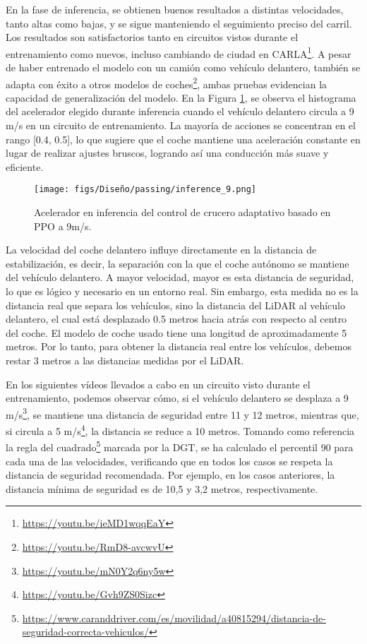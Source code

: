 En la fase de inferencia, se obtienen buenos resultados a distintas velocidades, tanto altas como bajas, y se sigue manteniendo el seguimiento preciso del carril. Los resultados son satisfactorios tanto en circuitos vistos durante el entrenamiento como nuevos, incluso cambiando de ciudad en CARLA\footnote{\url{https://youtu.be/ieMD1wqqEaY}}. A pesar de haber entrenado el modelo con un camión como vehículo delantero, también se adapta con éxito a otros modelos de coches\footnote{\url{https://youtu.be/RmD8-avcwvU}}, ambas pruebas evidencian la capacidad de generalización del modelo. En la Figura \ref{fig:infrence_passing}, se observa el histograma del acelerador elegido durante inferencia cuando el vehículo delantero circula a 9 m/s en un circuito de entrenamiento. La mayoría de acciones se concentran en el rango [0.4, 0.5], lo que sugiere que el coche mantiene una aceleración constante en lugar de realizar ajustes bruscos, logrando así una conducción más suave y eficiente.

\begin{figure}[ht]
\centering
\texttt{[image: figs/Diseño/passing/inference\_9.png]}
\caption{Acelerador en inferencia del control de crucero adaptativo basado en \ac{PPO} a 9m/s.}
\label{fig:infrence_passing}
\end{figure}

\newpage

La velocidad del coche delantero influye directamente en la distancia de estabilización, es decir, la separación con la que el coche autónomo se mantiene del vehículo delantero. A mayor velocidad, mayor es esta distancia de seguridad, lo que es lógico y necesario en un entorno real. Sin embargo, esta medida no es la distancia real que separa los vehículos, sino la distancia del \ac{LiDAR} al vehículo delantero, el cual está desplazado 0.5 metros hacia atrás con respecto al centro del coche. El modelo de coche usado tiene una longitud de aproximadamente 5 metros. Por lo tanto, para obtener la distancia real entre los vehículos, debemos restar 3 metros a las distancias medidas por el \ac{LiDAR}.

En los siguientes vídeos llevados a cabo en un circuito visto durante el entrenamiento, podemos observar cómo, si el vehículo delantero se desplaza a 9 m/s\footnote{\url{https://youtu.be/mN0Y2q6ny5w}}, se mantiene una distancia de seguridad entre 11 y 12 metros, mientras que, si circula a 5 m/s\footnote{\url{https://youtu.be/Gvh9ZS0Sizc}}, la distancia se reduce a 10 metros. Tomando como referencia la regla del cuadrado\footnote{\url{https://www.caranddriver.com/es/movilidad/a40815294/distancia-de-seguridad-correcta-vehiculos/}} marcada por la \ac{DGT}, se ha calculado el percentil 90 para cada una de las velocidades, verificando que en todos los casos se respeta la distancia de seguridad recomendada. Por ejemplo, en los casos anteriores, la distancia mínima de seguridad es de 10,5 y 3,2 metros, respectivamente.

